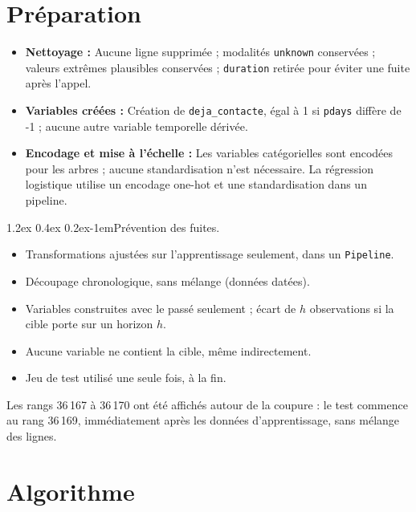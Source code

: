 \documentclass[11pt,a4paper]{article}
\makeatletter
\renewcommand\paragraph{\@startsection{paragraph}{4}{\z@}%
  {1.2ex \@plus 0.4ex \@minus 0.2ex}{-1em}{\normalfont\normalsize\bfseries}}
\makeatother
\begin{document}
\section{Préparation}
\label{sec:preparation}
\begin{itemize}
  \item \textbf{Nettoyage :} Aucune ligne supprimée ; modalités \texttt{unknown} conservées ; valeurs extrêmes plausibles conservées ; \texttt{duration} retirée pour éviter une fuite après l'appel.
  \item \textbf{Variables créées :} Création de \texttt{deja\_contacte}, égal à 1 si \texttt{pdays} diffère de -1 ; aucune autre variable temporelle dérivée.
  \item \textbf{Encodage et mise à l'échelle :} Les variables catégorielles sont encodées pour les arbres ; aucune standardisation n'est nécessaire. La régression logistique utilise un encodage one-hot et une standardisation dans un pipeline.
\end{itemize}

\paragraph{Prévention des fuites.}
\begin{itemize}
  \item[$\boxtimes$] Transformations ajustées sur l'apprentissage seulement, dans un \texttt{Pipeline}.
  \item[$\boxtimes$] Découpage chronologique, sans mélange (données datées).
  \item[$\boxtimes$] Variables construites avec le passé seulement ; écart de $h$ observations si la cible porte sur un horizon $h$.
  \item[$\boxtimes$] Aucune variable ne contient la cible, même indirectement.
  \item[$\boxtimes$] Jeu de test utilisé une seule fois, à la fin.
\end{itemize}
Les rangs 36\,167 à 36\,170 ont été affichés autour de la coupure : le test commence au rang 36\,169, immédiatement après les données d'apprentissage, sans mélange des lignes.

\section{Algorithme}
\label{sec:algorithme}
\end{document}
